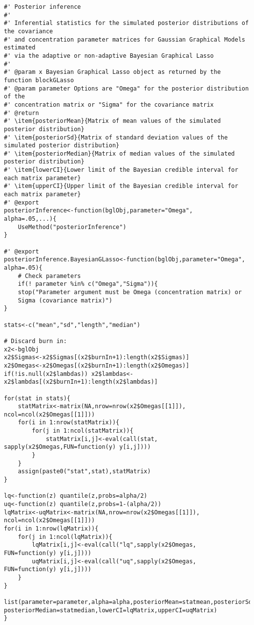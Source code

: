 \begin{lstlisting}
#' Posterior inference 
#'
#' Inferential statistics for the simulated posterior distributions of the covariance 
#' and concentration parameter matrices for Gaussian Graphical Models estimated
#' via the adaptive or non-adaptive Bayesian Graphical Lasso
#' 
#' @param x Bayesian Graphical Lasso object as returned by the function blockGLasso
#' @param parameter Options are "Omega" for the posterior distribution of the 
#' concentration matrix or "Sigma" for the covariance matrix
#' @return
#' \item{posteriorMean}{Matrix of mean values of the simulated posterior distribution}
#' \item{posteriorSd}{Matrix of standard deviation values of the simulated posterior distribution}
#' \item{posteriorMedian}{Matrix of median values of the simulated posterior distribution}
#' \item{lowerCI}{Lower limit of the Bayesian credible interval for each matrix parameter}
#' \item{upperCI}{Upper limit of the Bayesian credible interval for each matrix parameter}
#' @export
posteriorInference<-function(bglObj,parameter="Omega",
alpha=.05,...){
	UseMethod("posteriorInference")
}

#' @export
posteriorInference.BayesianGLasso<-function(bglObj,parameter="Omega",
alpha=.05){
	# Check parameters
	if(! parameter %in% c("Omega","Sigma")){
	stop("Parameter argument must be Omega (concentration matrix) or 
	Sigma (covariance matrix)")
}

stats<-c("mean","sd","length","median")

# Discard burn in:
x2<-bglObj
x2$Sigmas<-x2$Sigmas[(x2$burnIn+1):length(x2$Sigmas)]
x2$Omegas<-x2$Omegas[(x2$burnIn+1):length(x2$Omegas)]
if(!is.null(x2$lambdas)) x2$lambdas<-x2$lambdas[(x2$burnIn+1):length(x2$lambdas)]

for(stat in stats){
	statMatrix<-matrix(NA,nrow=nrow(x2$Omegas[[1]]), ncol=ncol(x2$Omegas[[1]]))
	for(i in 1:nrow(statMatrix)){
		for(j in 1:ncol(statMatrix)){
			statMatrix[i,j]<-eval(call(stat, sapply(x2$Omegas,FUN=function(y) y[i,j])))
		}
	}
	assign(paste0("stat",stat),statMatrix)
}

lq<-function(z) quantile(z,probs=alpha/2)
uq<-function(z) quantile(z,probs=1-(alpha/2))
lqMatrix<-uqMatrix<-matrix(NA,nrow=nrow(x2$Omegas[[1]]), ncol=ncol(x2$Omegas[[1]]))
for(i in 1:nrow(lqMatrix)){
	for(j in 1:ncol(lqMatrix)){
		lqMatrix[i,j]<-eval(call("lq",sapply(x2$Omegas, FUN=function(y) y[i,j])))
		uqMatrix[i,j]<-eval(call("uq",sapply(x2$Omegas, FUN=function(y) y[i,j])))
	}
}

list(parameter=parameter,alpha=alpha,posteriorMean=statmean,posteriorSd=statsd,
posteriorMedian=statmedian,lowerCI=lqMatrix,upperCI=uqMatrix)
}

\end{lstlisting}

